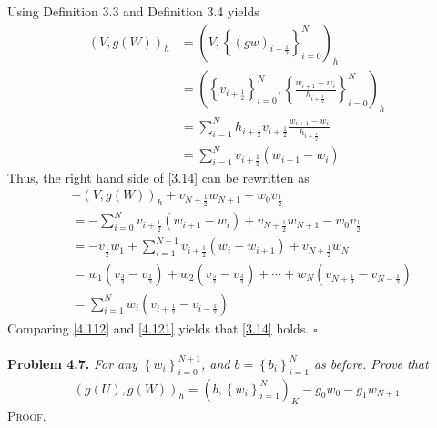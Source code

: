 \documentclass[a4paper]{article}
\numberwithin{equation}{section}
\begin{document}
Using Definition 3.3 and Definition 3.4 yields
\begin{align}
{\left( {V,g\left( W \right)} \right)_h} &= {\left( {V,\left\{ {{{\left( {gw} \right)}_{i + \frac{1}{2}}}} \right\}_{i = 0}^N} \right)_h}\\
 &= {\left( {\left\{ {{v_{i + \frac{1}{2}}}} \right\}_{i = 0}^N,\left\{ {\frac{{{w_{i + 1}} - {w_i}}}{{{h_{i + \frac{1}{2}}}}}} \right\}_{i = 0}^N} \right)_h}\\
 &= \sum\limits_{i = 1}^N {{h_{i + \frac{1}{2}}}{v_{i + \frac{1}{2}}}\frac{{{w_{i + 1}} - {w_i}}}{{{h_{i + \frac{1}{2}}}}}} \\
 &= \sum\limits_{i = 1}^N {{v_{i + \frac{1}{2}}}\left( {{w_{i + 1}} - {w_i}} \right)} 
\end{align}
Thus, the right hand side of \eqref{3.14} can be rewritten as
\begin{align}
 &- {\left( {V,g\left( W \right)} \right)_h} + {v_{N + \frac{1}{2}}}{w_{N + 1}} - {w_0}{v_{\frac{1}{2}}}\\
 &=  - \sum\limits_{i = 0}^N {{v_{i + \frac{1}{2}}}\left( {{w_{i + 1}} - {w_i}} \right)}  + {v_{N + \frac{1}{2}}}{w_{N + 1}} - {w_0}{v_{\frac{1}{2}}}\\
& =  - {v_{\frac{1}{2}}}{w_1} + \sum\limits_{i = 1}^{N - 1} {{v_{i + \frac{1}{2}}}\left( {{w_i} - {w_{i + 1}}} \right)}  + {v_{N + \frac{1}{2}}}{w_N}\\
& = {w_1}\left( {{v_{\frac{3}{2}}} - {v_{\frac{1}{2}}}} \right) + {w_2}\left( {{v_{\frac{5}{2}}} - {v_{\frac{3}{2}}}} \right) +  \cdots  + {w_N}\left( {{v_{N + \frac{1}{2}}} - {v_{N - \frac{1}{2}}}} \right)\\
& = \sum\limits_{i = 1}^N {{w_i}\left( {{v_{i + \frac{1}{2}}} - {v_{i - \frac{1}{2}}}} \right)} \label{4.121}
\end{align}
Comparing \eqref{4.112} and \eqref{4.121} yields that \eqref{3.14} holds. \hfill $\square$\\
\\
\textbf{Problem 4.7.} \textit{For any $\left\{ {{w_i}} \right\}_{i = 0}^{N + 1}$, and $b = \left\{ {{b_i}} \right\}_{i = 1}^N$ as before. Prove that}
\begin{align}
\label{4.122}
{\left( {g\left( U \right),g\left( W \right)} \right)_h} = \left( {b,\left\{ {{w_i}} \right\}_{i = 1}^N} \right)_K - {g_0}{w_0} - {g_1}{w_{N + 1}}
\end{align}
\textsc{Proof.} 
\end{document}
